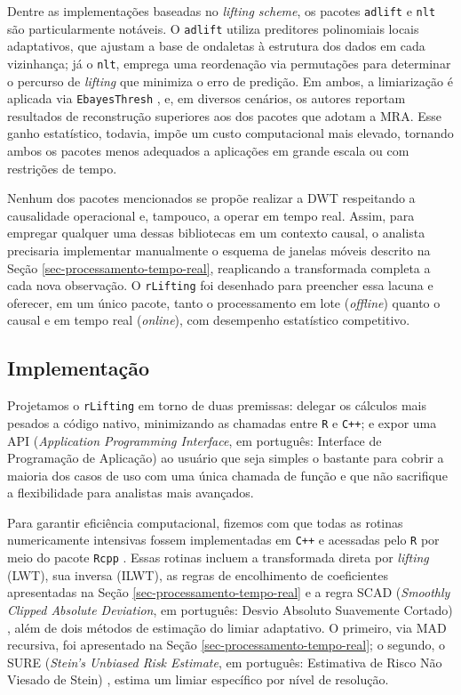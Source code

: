 Dentre as implementações baseadas no \emph{lifting scheme}, os pacotes \texttt{adlift} e \texttt{nlt} \cite{nunes_adaptive_2006, knight_nlt_2008} são particularmente notáveis. 
O \texttt{adlift} utiliza preditores polinomiais locais adaptativos, que ajustam a base de ondaletas à estrutura dos dados em cada vizinhança; já o \texttt{nlt}, emprega uma reordenação via permutações para determinar o percurso de \emph{lifting} que minimiza o erro de predição. 
Em ambos, a limiarização é aplicada via \texttt{EbayesThresh} \cite{silverman_ebayesthresh_2004}, e, em diversos cenários, os autores reportam resultados de reconstrução superiores aos dos pacotes que adotam a MRA. 
Esse ganho estatístico, todavia, impõe um custo computacional mais elevado, tornando ambos os pacotes menos adequados a aplicações em grande escala ou com restrições de tempo.

Nenhum dos pacotes mencionados se propõe realizar a DWT respeitando a causalidade operacional e, tampouco, a operar em tempo real. 
Assim, para empregar qualquer uma dessas bibliotecas em um contexto causal, o analista precisaria implementar manualmente o esquema de janelas móveis descrito na Seção \ref{sec-processamento-tempo-real}, reaplicando a transformada completa a cada nova observação. 
O \texttt{rLifting} foi desenhado para preencher essa lacuna e oferecer, em um único pacote, tanto o processamento em lote (\emph{offline}) quanto o causal e em tempo real (\emph{online}), com desempenho estatístico competitivo.

\subsection{Implementação}\label{sec-rlifting-implementacao}

Projetamos o \texttt{rLifting} em torno de duas premissas: delegar os cálculos mais pesados a código nativo, minimizando as chamadas entre \texttt{R} e \texttt{C++}; e expor uma API (\emph{Application Programming Interface}, em português: Interface de Programação de Aplicação) ao usuário que seja simples o bastante para cobrir a maioria dos casos de uso com uma única chamada de função e que não sacrifique a flexibilidade para analistas mais avançados.

Para garantir eficiência computacional, fizemos com que todas as rotinas numericamente intensivas fossem implementadas em \texttt{C++} e acessadas pelo \texttt{R} por meio do pacote \texttt{Rcpp} \cite{eddelbuettel_rcpp_2008}. 
Essas rotinas incluem a transformada direta por \emph{lifting} (LWT), sua inversa (ILWT), as regras de encolhimento de coeficientes apresentadas na Seção \ref{sec-processamento-tempo-real} e a regra SCAD (\emph{Smoothly Clipped Absolute Deviation}, em português: Desvio Absoluto Suavemente Cortado) \cite{antoniadis_regularization_2001}, além de dois métodos de estimação do limiar adaptativo.
O primeiro, via MAD recursiva, foi apresentado na Seção \ref{sec-processamento-tempo-real}; o segundo, o SURE (\emph{Stein's Unbiased Risk Estimate}, em português: Estimativa de Risco Não Viesado de Stein) \cite{donoho_adapting_1995}, estima um limiar específico por nível de resolução. 

